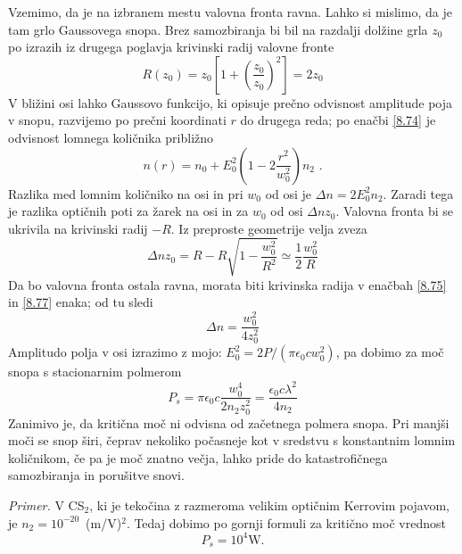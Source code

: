 Vzemimo, da je na izbranem mestu valovna fronta ravna. Lahko si mislimo,
da je tam grlo Gaussovega snopa. Brez samozbiranja bi bil na razdalji
dolžine grla $z_{0}$ po izrazih iz drugega poglavja krivinski radij
valovne fronte 
\begin{equation}
R(z_{0})=z_{0}[1+\left(\frac{z_{0}}{z_{0}}\right)^{2}]=2z_{0}\label{8.75}
\end{equation}
 V bližini osi lahko Gaussovo funkcijo, ki opisuje prečno odvisnost
amplitude poja v snopu, razvijemo po prečni koordinati $r$ do drugega
reda; po enačbi \ref{8.74} je odvisnost lomnega količnika približno
\begin{equation}
n(r)=n_{0}+E_{0}^{2}(1-2\frac{r^{2}}{w_{0}^{2}})n_{2}\text{ .}\label{8.76}
\end{equation}
 Razlika med lomnim količniko na osi in pri $w_{0}$ od osi je $\Delta n=2E_{0}^{2}n_{2}$.
Zaradi tega je razlika optičnih poti za žarek na osi in za $w_{0}$
od osi $\Delta nz_{0}$. Valovna fronta bi se ukrivila na krivinski
radij $-R$. Iz preproste geometrije velja zveza 
\begin{equation}
\Delta nz_{0}=R-R\sqrt{1-\frac{w_{0}^{2}}{R^{2}}}\simeq\frac{1}{2}\frac{w_{0}^{2}}{R}\label{8.77}
\end{equation}
 Da bo valovna fronta ostala ravna, morata biti krivinska radija v
enačbah \ref{8.75} in \ref{8.77} enaka; od tu sledi 
\begin{equation}
\Delta n=\frac{w_{0}^{2}}{4z_{0}^{2}}\label{8.78}
\end{equation}
 Amplitudo polja v osi izrazimo z mo\textquotedbl{}jo: $E_{0}^{2}=2P/(\pi\epsilon_{0}cw_{0}^{2})$,
pa dobimo za moč snopa s stacionarnim polmerom 
\begin{equation}
P_{s}=\pi\epsilon_{0}c\frac{w_{0}^{4}}{2n_{2}z_{0}^{2}}=\frac{\epsilon_{0}c\lambda^{2}}{4n_{2}}\label{8.79}
\end{equation}
 Zanimivo je, da kritična moč ni odvisna od začetnega polmera snopa.
Pri manjši moči se snop širi, čeprav nekoliko počasneje kot v sredstvu
s konstantnim lomnim količnikom, če pa je moč znatno večja, lahko
pride do katastrofičnega samozbiranja in porušitve snovi.

\textit{Primer. }V CS$_{2}$, ki je tekočina z razmeroma velikim optičnim
Kerrovim pojavom, je $n_{2}=10^{-20}$~(m/V)$^{2}$. Tedaj dobimo
po gornji formuli za kritično moč vrednost 
\[
P_{s}=10^{4}\text{W.}
\]


